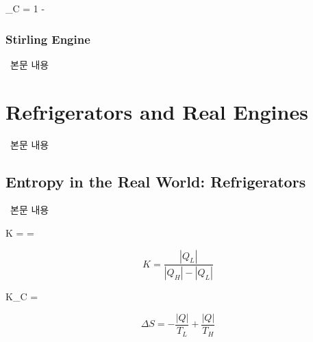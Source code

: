 \begin{eqbox} \varepsilon_C = 1 -  ~~~~~ 
\label{eq:efficiency_of_carnot_engine} \end{eqbox}

\subsubsection{Stirling Engine}
%
\ 본문 내용

\section{Refrigerators and Real Engines}
%
\ 본문 내용

\subsection{Entropy in the Real World: Refrigerators}
%
\ 본문 내용

\begin{eqbox} K =  =  ~~~~~ 
\label{eq:coefficient_of_performance_of_any_refrigerator} \end{eqbox}

\begin{equation} K = \frac{\left| Q_L \right|}{\left| Q_H \right| - \left| Q_L \right|} \end{equation}

\begin{eqbox} K_C =  ~~~~~ 
\label{eq:coefficient_of_performance_of_carnot_refrigerator} \end{eqbox}

\begin{equation*} \Delta S = -\frac{\left| Q \right|}{T_L} + \frac{\left| Q \right|}{T_H} \end{equation*}

